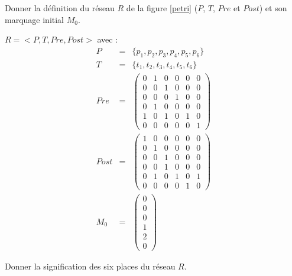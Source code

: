 \documentclass[a4paper]{article}
\begin{document}
\begin{questions}
\question Donner la définition du réseau $R$ de la figure \ref{petri} ($P$, $T$, $Pre$ et $Post$) et son marquage initial $M_0$. 

\begin{correction}{.8}
	$R = <P, T, Pre, Post>$ avec :
	\begin{eqnarray*}
	P &=& \{p_1, p_2, p_3, p_4, p_5, p_6\}\\
	T &=& \{t_1, t_2, t_3, t_4, t_5, t_6\}\\
	Pre &=& \begin{pmatrix}
		0 & 1 & 0 & 0 & 0 & 0 \\ %
		0 & 0 & 1 & 0 & 0 & 0 \\ %
		0 & 0 & 0 & 1 & 0 & 0 \\ %
		0 & 1 & 0 & 0 & 0 & 0 \\ %
		1 & 0 & 1 & 0 & 1 & 0 \\ %
		0 & 0 & 0 & 0 & 0 & 1    %
		\end{pmatrix}\\
	Post &=& \begin{pmatrix}
		1 & 0 & 0 & 0 & 0 & 0 \\ %
		0 & 1 & 0 & 0 & 0 & 0 \\ %
		0 & 0 & 1 & 0 & 0 & 0 \\ %
		0 & 0 & 1 & 0 & 0 & 0 \\ %
		0 & 1 & 0 & 1 & 0 & 1 \\ %
		0 & 0 & 0 & 0 & 1 & 0    %
		\end{pmatrix}\\
	M_0 &=& \begin{pmatrix} 0\\ 0\\ 0\\ 1\\ 2\\ 0\end{pmatrix}
	\end{eqnarray*}
\end{correction}

\question Donner la signification des six places du réseau $R$. 


\end{questions}
\end{document}
